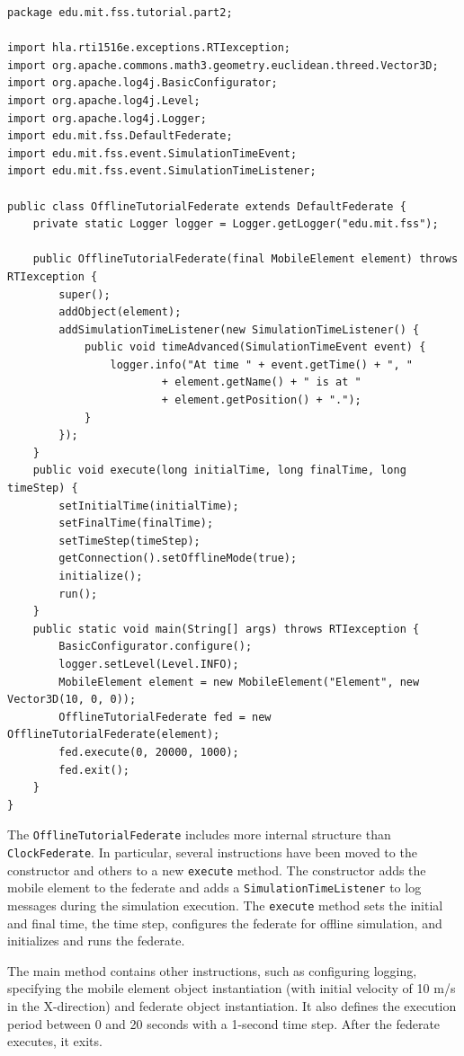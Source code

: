 \documentclass[]{article}
\begin{document}
\begin{Code}
\begin{lstlisting}[caption={OfflineTutorialFederate object class},label={lst:offlineTutorialFederate}]
package edu.mit.fss.tutorial.part2;

import hla.rti1516e.exceptions.RTIexception;
import org.apache.commons.math3.geometry.euclidean.threed.Vector3D;
import org.apache.log4j.BasicConfigurator;
import org.apache.log4j.Level;
import org.apache.log4j.Logger;
import edu.mit.fss.DefaultFederate;
import edu.mit.fss.event.SimulationTimeEvent;
import edu.mit.fss.event.SimulationTimeListener;

public class OfflineTutorialFederate extends DefaultFederate {
	private static Logger logger = Logger.getLogger("edu.mit.fss");

	public OfflineTutorialFederate(final MobileElement element) throws RTIexception {
		super();
		addObject(element);
		addSimulationTimeListener(new SimulationTimeListener() {
			public void timeAdvanced(SimulationTimeEvent event) {
				logger.info("At time " + event.getTime() + ", " 
						+ element.getName() + " is at " 
						+ element.getPosition() + ".");
			}
		});
	}
	public void execute(long initialTime, long finalTime, long timeStep) {
		setInitialTime(initialTime);
		setFinalTime(finalTime);
		setTimeStep(timeStep);
		getConnection().setOfflineMode(true);
		initialize();
		run();
	}
	public static void main(String[] args) throws RTIexception {
		BasicConfigurator.configure();
		logger.setLevel(Level.INFO);
		MobileElement element = new MobileElement("Element", new Vector3D(10, 0, 0));
		OfflineTutorialFederate fed = new OfflineTutorialFederate(element);
		fed.execute(0, 20000, 1000);
		fed.exit();
	}
}
\end{lstlisting}
\end{Code}

The \texttt{OfflineTutorialFederate} includes more internal structure than \texttt{ClockFederate}. In particular, several instructions have been moved to the constructor and others to a new \texttt{execute} method. The constructor adds the mobile element to the federate and adds a \texttt{SimulationTimeListener} to log messages during the simulation execution. The \texttt{execute} method sets the initial and final time, the time step, configures the federate for offline simulation, and initializes and runs the federate.

The main method contains other instructions, such as configuring logging, specifying the mobile element object instantiation (with initial velocity of 10 m/s in the X-direction) and federate object instantiation. It also defines the execution period between 0 and 20 seconds with a 1-second time step. After the federate executes, it exits.
\end{document}
